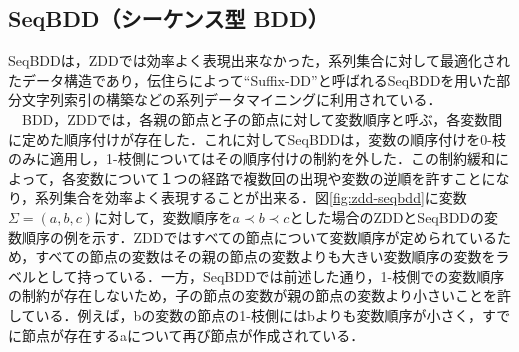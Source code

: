 \documentclass[12pt,twoside, fleqn]{ujbook}
\begin{document}
	\newpage
	\subsection{SeqBDD（シーケンス型 BDD）}
	\label{seqbdd}
	SeqBDD\cite{Loekito:2010:BDD:1851388.1851396}は，ZDDでは効率よく表現出来なかった，系列集合に対して最適化されたデータ構造であり，伝住ら\cite{suffixdd}によって``Suffix-DD''と呼ばれるSeqBDDを用いた部分文字列索引の構築などの系列データマイニングに利用されている．\\
	　BDD，ZDDでは，各親の節点と子の節点に対して変数順序と呼ぶ，各変数間に定めた順序付けが存在した．これに対してSeqBDDは，変数の順序付けを0-枝のみに適用し，1-枝側についてはその順序付けの制約を外した．この制約緩和によって，各変数について１つの経路で複数回の出現や変数の逆順を許すことになり，系列集合を効率よく表現することが出来る．図\ref{fig:zdd-seqbdd}に変数$\Sigma=(a,b,c)$に対して，変数順序を$a\prec b\prec c$とした場合のZDDとSeqBDDの変数順序の例を示す．ZDDではすべての節点について変数順序が定められているため，すべての節点の変数はその親の節点の変数よりも大きい変数順序の変数をラベルとして持っている．一方，SeqBDDでは前述した通り，1-枝側での変数順序の制約が存在しないため，子の節点の変数が親の節点の変数より小さいことを許している．例えば，bの変数の節点の1-枝側にはbよりも変数順序が小さく，すでに節点が存在するaについて再び節点が作成されている．
\end{document}
